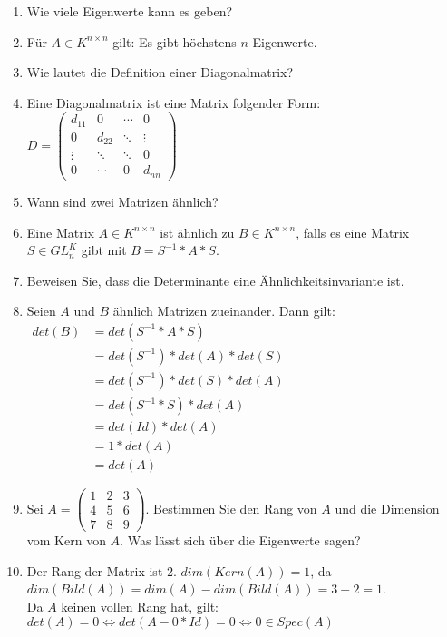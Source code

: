 \documentclass[11pt,parskip=full]{scrartcl}
\newcommand{\answer}{\item[\textbf{Antwort}]}
\begin{document}
\begin{enumerate}[label=\textbf{\arabic*. Frage}]
		\item Wie viele Eigenwerte kann es geben?
		\answer Für \(A \in K^{n \times n}\) gilt: Es gibt höchstens $n$ Eigenwerte.
		
		\item Wie lautet die Definition einer Diagonalmatrix?
		\answer Eine Diagonalmatrix ist eine Matrix folgender Form: \(D=\left( \begin{array}{cccc}{d_{11}} & {0} & {\cdots} & {0} \\ {0} & {d_{22}} & {\ddots} & {\vdots} \\ {\vdots} & {\ddots} & {\ddots} & {0} \\ {0} & {\cdots} & {0} & {d_{n n}}\end{array}\right)\)
		
		\item Wann sind zwei Matrizen ähnlich?
		\answer Eine Matrix \(A \in K^{n \times n}\) ist ähnlich zu \(B \in K^{n \times n}\), falls es eine Matrix \(S \in GL_{n}^{K}\) gibt mit \(B = S^{-1} * A * S\).
		
		\item Beweisen Sie, dass die Determinante eine Ähnlichkeitsinvariante ist.
		\answer Seien $A$ und $B$ ähnlich Matrizen zueinander. Dann gilt:\\
		\(\begin{aligned}
			det(B) &= det(S^{-1}*A*S)\\ &= det(S^{-1}) * det(A) * det(S)\\ &= det(S^{-1}) * det(S) * det(A)\\ &= det(S^{-1}*S) * det(A)\\ &= det(Id) * det(A)\\ &= 1 * det(A)\\ &= det(A)
		\end{aligned}\)
		
		\item 
		Sei \(A =
		\begin{pmatrix}
			1 & 2 & 3 \\
			4 & 5 & 6 \\
			7 & 8 & 9
		\end{pmatrix}\). Bestimmen Sie den Rang von $A$ und die Dimension vom Kern von $A$. Was lässt sich über die Eigenwerte sagen?
		\answer Der Rang der Matrix ist 2. \(dim(Kern(A)) = 1\), da \(dim(Bild(A)) = dim(A) - dim(Bild(A)) = 3 - 2 = 1\). \\
		Da $A$ keinen vollen Rang hat, gilt:\\
		\(det(A) = 0 \iff det(A-0*Id) = 0 \iff 0 \in Spec(A)\)
		

\end{enumerate}
\end{document}
